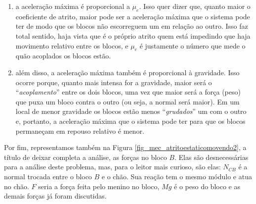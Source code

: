 \begin{enumerate}
    \item [(i)] a aceleração máxima é proporcional a $\mu_e$. Isso quer dizer que, quanto maior o coeficiente de atrito, maior pode ser a aceleração máxima que o sistema pode ter de modo que os blocos não escorreguem um em relação ao outro. Isso faz total sentido, haja vista que é o próprio atrito quem está impedindo que haja movimento relativo entre os blocos, e $\mu_e$ é justamente o número que mede o quão acoplados os blocos estão.

    \item [(ii)] além disso, a aceleração máxima também é proporcional à gravidade. Isso ocorre porque, quanto mais intensa for a gravidade, maior será o ``\textit{acoplamento}'' entre os dois blocos, uma vez que maior será a força (peso) que puxa um bloco contra o outro (ou seja, a normal será maior). Em um local de menor gravidade os blocos estão menos ``\textit{grudados}'' um com o outro e, portanto, a aceleração máxima que o sistema pode ter para que os blocos permaneçam em repouso relativo é menor.
\end{enumerate}







Por fim, representamos também na Figura \ref{fig_mec_atritoestaticomovendo2}, a título de deixar completa a análise, as forças no bloco $B.$ Elas são desnecessárias para a análise deste problema, mas, para o leitor mais curioso, são elas: $N_{CB}$ é a normal trocada entre o bloco $B$ e o chão. Sua reação tem o mesmo módulo e atua no chão. $F$ seria a força feita pelo menino no bloco, $Mg$ é o peso do bloco e as demais forças já foram discutidas.

\vspace{0.3cm}


